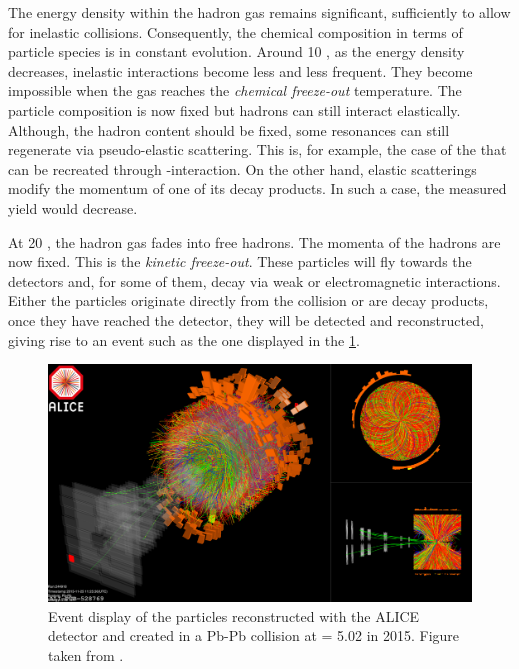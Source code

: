 The energy density within the hadron gas remains significant, sufficiently to allow for inelastic collisions. Consequently, the chemical composition in terms of particle species is in constant evolution. Around 10 \fmC, as the energy density decreases, inelastic interactions become less and less frequent. They become impossible when the gas reaches the \textit{chemical freeze-out} temperature. The particle composition is now fixed but hadrons can still interact elastically.\\

Although, the hadron content should be fixed, some resonances can still regenerate via pseudo-elastic scattering. This is, for example, the case of the \rmKstarZero that can be recreated through \rmPiPM-\Kminplus interaction. On the other hand, elastic scatterings modify the momentum of one of its decay products. In such a case, the measured yield would decrease.  

At 20 \fmC, the hadron gas fades into free hadrons. The momenta of the hadrons are now fixed. This is the \textit{kinetic freeze-out}. These particles will fly towards the detectors and, for some of them, decay via weak or electromagnetic interactions. Either the particles originate directly from the collision or are decay products, once they have reached the detector, they will be detected and reconstructed, giving rise to an event such as the one displayed in the \fig\ref{fig:ALICEEventDisplay}.

\begin{figure}[h]
	\centering
	\includegraphics[width=\textwidth]{Figs/Chapter2/ALICE_EventDisplay.eps}
	\caption{Event display of the particles reconstructed with the ALICE detector and created in a Pb-Pb collision at \sqrtSnn = 5.02 \tev in 2015. Figure taken from \cite{alicecollaborationALICEExperimentJourney2022}.}
	\label{fig:ALICEEventDisplay}
\end{figure}

